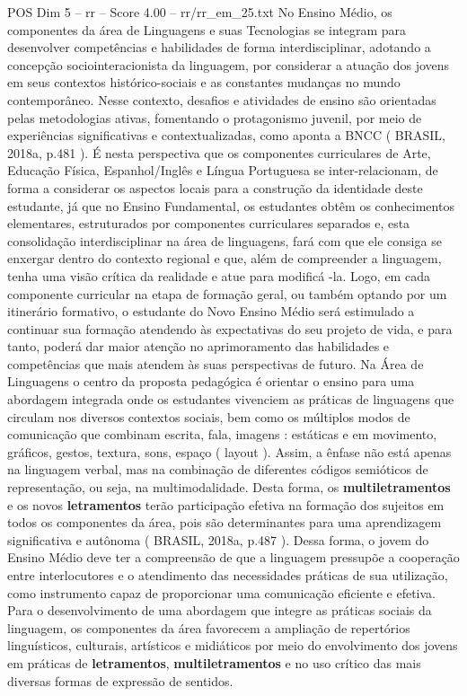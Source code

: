\begin{textsample}{POS Dim 5 – rr – Score 4.00 – rr/rr\_em\_25.txt}
No Ensino Médio, os componentes da área de Linguagens e suas Tecnologias se integram para desenvolver competências e habilidades de forma interdisciplinar, adotando a concepção sociointeracionista da linguagem, por considerar a atuação dos jovens em seus contextos histórico-sociais e as constantes mudanças no mundo contemporâneo.
Nesse contexto, desafios e atividades de ensino são orientadas pelas metodologias ativas, fomentando o protagonismo juvenil, por meio de experiências significativas e contextualizadas, como aponta a BNCC ( BRASIL, 2018a, p.481 ).
É nesta perspectiva que os componentes curriculares de Arte, Educação Física, Espanhol/Inglês e Língua Portuguesa se inter-relacionam, de forma a considerar os aspectos locais para a construção da identidade deste estudante, já que no Ensino Fundamental, os estudantes obtêm os conhecimentos elementares, estruturados por componentes curriculares separados e, esta consolidação interdisciplinar na área de linguagens, fará com que ele consiga se enxergar dentro do contexto regional e que, além de compreender a linguagem, tenha uma visão crítica da realidade e atue para modificá -la.
Logo, em cada componente curricular na etapa de formação geral, ou também optando por um itinerário formativo, o estudante do Novo Ensino Médio será estimulado a continuar sua formação atendendo às expectativas do seu projeto de vida, e para tanto, poderá dar maior atenção no aprimoramento das habilidades e competências que mais atendem às suas perspectivas de futuro.
Na Área de Linguagens o centro da proposta pedagógica é orientar o ensino para uma abordagem integrada onde os estudantes vivenciem as práticas de linguagens que circulam nos diversos contextos sociais, bem como os múltiplos modos de comunicação que combinam escrita, fala, imagens : estáticas e em movimento, gráficos, gestos, textura, sons, espaço ( layout ).
Assim, a ênfase não está apenas na linguagem verbal, mas na combinação de diferentes códigos semióticos de representação, ou seja, na multimodalidade.
Desta forma, os \textbf{multiletramentos} e os novos \textbf{letramentos} terão participação efetiva na formação dos sujeitos em todos os componentes da área, pois são determinantes para uma aprendizagem significativa e autônoma ( BRASIL, 2018a, p.487 ).
Dessa forma, o jovem do Ensino Médio deve ter a compreensão de que a linguagem pressupõe a cooperação entre interlocutores e o atendimento das necessidades práticas de sua utilização, como instrumento capaz de proporcionar uma comunicação eficiente e efetiva.
Para o desenvolvimento de uma abordagem que integre as práticas sociais da linguagem, os componentes da área favorecem a ampliação de repertórios linguísticos, culturais, artísticos e midiáticos por meio do envolvimento dos jovens em práticas de \textbf{letramentos}, \textbf{multiletramentos} e no uso crítico das mais diversas formas de expressão de sentidos.

\end{textsample}
